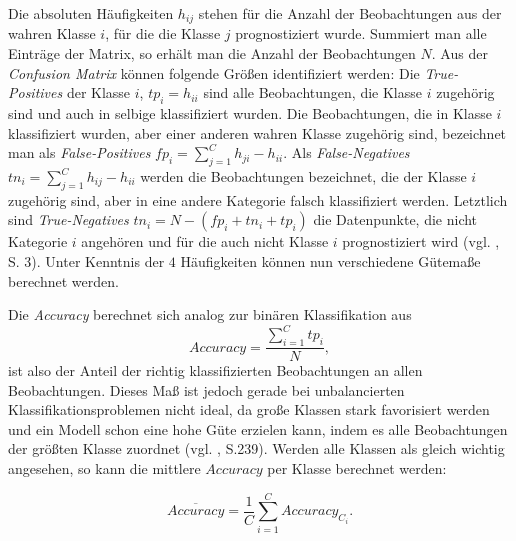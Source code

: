 \documentclass[a4paper,11pt]{article}
\begin{document}
Die absoluten Häufigkeiten $h_{ij}$ stehen für die Anzahl der Beobachtungen aus der wahren Klasse $i$, für die die Klasse $j$ prognostiziert wurde. Summiert man alle Einträge der Matrix, so erhält man die Anzahl der Beobachtungen $N$. Aus der \textit{Confusion Matrix} können folgende Größen identifiziert werden: Die \textit{True-Positives} der Klasse $i$, $tp_i = h_{ii}$ sind alle Beobachtungen, die Klasse $i$ zugehörig sind und auch in selbige klassifiziert wurden. Die Beobachtungen, die in Klasse $i$ klassifiziert wurden, aber einer anderen wahren Klasse zugehörig sind, bezeichnet man als \textit{False-Positives} $fp_i = \sum_{j = 1}^C h_{ji} - h_{ii}$. Als \textit{False-Negatives} $tn_i = \sum_{j = 1}^C h_{ij} - h_{ii}$ werden die Beobachtungen bezeichnet, die der Klasse $i$ zugehörig sind, aber in eine andere Kategorie falsch klassifiziert werden. Letztlich sind \textit{True-Negatives} $tn_i = N - (fp_i + tn_i + tp_i)$ die Datenpunkte, die nicht Kategorie $i$ angehören und für die auch nicht Klasse $i$ prognostiziert wird (vgl. \cite{sokolova}, S. 3). Unter Kenntnis der $4$ Häufigkeiten können nun verschiedene Gütemaße berechnet werden. 


Die \textit{Accuracy} berechnet sich analog zur binären Klassifikation aus 
\[ Accuracy = \frac{\sum_{i=1}^C tp_i}{N},  \]
ist also der Anteil der richtig klassifizierten Beobachtungen an allen Beobachtungen. Dieses Maß ist jedoch gerade bei unbalancierten Klassifikationsproblemen nicht ideal, da große Klassen stark favorisiert werden und ein Modell schon eine hohe Güte erzielen kann, indem es alle Beobachtungen der größten Klasse zuordnet (vgl. \cite{backhaus}, S.239). Werden alle Klassen als gleich wichtig angesehen, so kann die mittlere $Accuracy$ per Klasse berechnet werden: 

\[\overline{Accuracy} = \frac{1}{C} \sum_{i = 1}^C Accuracy_{C_i} .\]
\end{document}
